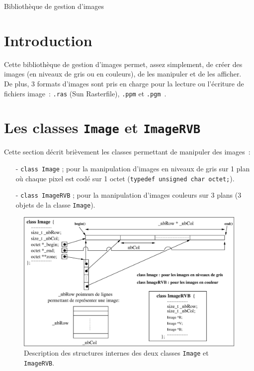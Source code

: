 \documentclass[12pt]{article}
\begin{document}
\begin{LARGE}
\begin{bf}
\begin{center}
Biblioth\`eque de gestion d'images

\end{center}
\end{bf}
\end{LARGE}

\section{Introduction}

Cette biblioth\`eque de gestion d'images permet, assez simplement, de
cr\'eer des images (en niveaux de gris ou en couleurs), de les
manipuler et de les afficher.\\
De plus, 3 formats d'images sont pris
en charge pour la lecture ou l'\'ecriture de fichiers image~:
{\tt .ras} (Sun Rasterfile), {\tt .ppm} et {\tt .pgm}~.

\section{Les classes {\tt Image} et {\tt ImageRVB}}

Cette section d\'ecrit bri\`evement les classes permettant de
manipuler des images~:
\begin{itemize}
\item[-] {\tt class Image} ; pour la manipulation d'images
en niveaux de gris sur 1 plan o\`u chaque pixel est
cod\'e sur 1 octet ({\tt typedef unsigned char octet;}).
\item[-] {\tt class ImageRVB} ; pour la manipulation d'images
couleurs sur 3 plans (3 objets de la classe {\tt Image}).
\end{itemize}

\begin{figure}[hbtp]
\begin{center}
\includegraphics[width=15.5cm]{fig/classImage}
\end{center}
\caption{Description des structures internes des deux classes
{\tt Image} et {\tt ImageRVB}.}
\end{figure}
\end{document}
